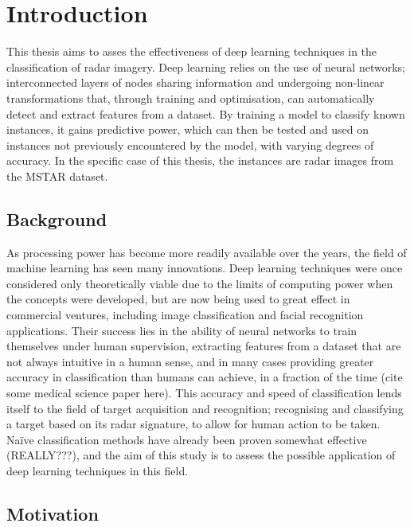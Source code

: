 \chapter{Introduction}


This thesis aims to asses the effectiveness of deep learning techniques in the classification of radar imagery. Deep learning relies on the use of neural networks; interconnected layers of nodes sharing information and undergoing non-linear transformations that, through training and optimisation, can automatically detect and extract features from a dataset. By training a model to classify known instances, it gains predictive power, which can then be tested and used on instances not previously encountered by the model, with varying degrees of accuracy. In the specific case of this thesis, the instances are radar images from the MSTAR dataset.






\section{Background}
As processing power has become more readily available over the years, the field of machine learning has seen many innovations. Deep learning techniques were once considered only theoretically viable due to the limits of computing power when the concepts were developed, but are now being used to great effect in commercial ventures, including image classification and facial recognition applications. Their success lies in the ability of neural networks to train themselves under human supervision,  extracting features from a dataset that are not always intuitive in a human sense, and in many cases providing greater accuracy in classification than humans can achieve, in a fraction of the time (cite some medical science paper here). This accuracy and speed of classification lends itself to the field of target acquisition and recognition; recognising and classifying a target based on its radar signature, to allow for human action to be taken. Na{\"i}ve classification methods have already been proven somewhat effective (REALLY???), and the aim of this study is to assess the possible application of deep learning techniques in this field.

\section{Motivation}

